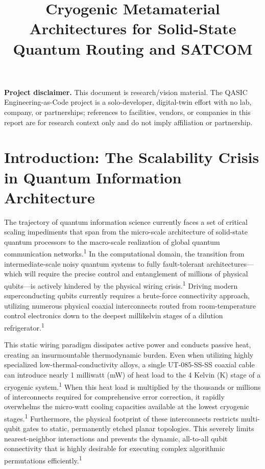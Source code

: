 \documentclass[11pt, a4paper]{article}
\title{\textbf{Cryogenic Metamaterial Architectures for Solid-State Quantum Routing and SATCOM}}
\author{}
\date{}
\begin{document}
\maketitle

\noindent\textbf{Project disclaimer.} This document is research/vision material. The QASIC Engineering-as-Code project is a solo-developer, digital-twin effort with no lab, company, or partnerships; references to facilities, vendors, or companies in this report are for research context only and do not imply affiliation or partnership.

\section*{Introduction: The Scalability Crisis in Quantum Information Architecture}

The trajectory of quantum information science currently faces a set of critical scaling impediments that span from the micro-scale architecture of solid-state quantum processors to the macro-scale realization of global quantum communication networks.\textsuperscript{1} In the computational domain, the transition from intermediate-scale noisy quantum systems to fully fault-tolerant architectures---which will require the precise control and entanglement of millions of physical qubits---is actively hindered by the physical wiring crisis.\textsuperscript{1} Driving modern superconducting qubits currently requires a brute-force connectivity approach, utilizing numerous physical coaxial interconnects routed from room-temperature control electronics down to the deepest millikelvin stages of a dilution refrigerator.\textsuperscript{1}

This static wiring paradigm dissipates active power and conducts passive heat, creating an insurmountable thermodynamic burden. Even when utilizing highly specialized low-thermal-conductivity alloys, a single UT-085-SS-SS coaxial cable can introduce nearly 1 milliwatt (mW) of heat load to the 4 Kelvin (K) stage of a cryogenic system.\textsuperscript{1} When this heat load is multiplied by the thousands or millions of interconnects required for comprehensive error correction, it rapidly overwhelms the micro-watt cooling capacities available at the lowest cryogenic stages.\textsuperscript{1} Furthermore, the physical footprint of these interconnects restricts multi-qubit gates to static, permanently etched planar topologies. This severely limits nearest-neighbor interactions and prevents the dynamic, all-to-all qubit connectivity that is highly desirable for executing complex algorithmic permutations efficiently.\textsuperscript{1}
\end{document}
